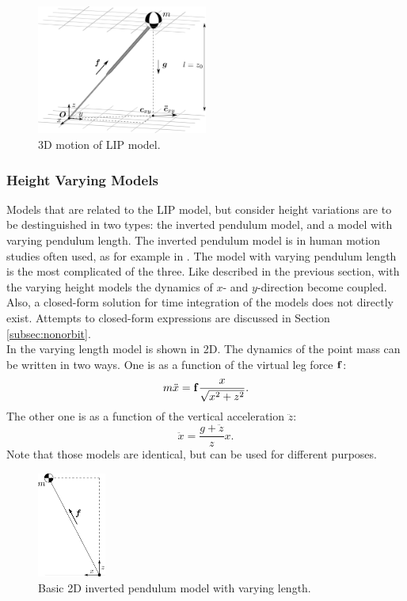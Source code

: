 \begin{figure}[h]
\centering
\includegraphics[width=0.5\textwidth]{STYLESTUFF/3DCoMwithoutfoot.png}
\caption{\ac{3D} motion of \ac{LIP} model.}
\label{fig:3dlip}
\end{figure}

\subsubsection{Height Varying Models}
Models that are related to the \ac{LIP} model, but consider height variations are to be destinguished in two types: the inverted pendulum model, and a model with varying pendulum length. The inverted pendulum model is in human motion studies often used, as for example in \cite{kuo2005energetic}. The model with varying pendulum length is the most complicated of the three. Like described in the previous section, with the varying height models the dynamics of $x$- and $y$-direction become coupled. Also, a closed-form solution for time integration of the models does not directly exist. Attempts to closed-form expressions are discussed in Section \ref{subsec:nonorbit}. \\
In  the varying length model is shown in \ac{2D}. The dynamics of the point mass can be written in two ways. One is as a function of the virtual leg force $\mathbf{f}$:
\begin{equation}
	m\ddot{x} = \mathbf{f}\frac{x}{\sqrt{x^2 + z^2}}.
	\label{eq:dynamicsprattstyle}
\end{equation}
The other one is as a function of the vertical acceleration $\ddot{z}$:
\begin{equation}
	\ddot{x} = \frac{g+\ddot{z}}{z}x.
	\label{eq:dynamicscaronstyle}
\end{equation}
Note that those models are identical, but can be used for different purposes.
\begin{figure}[h]
\centering
\includegraphics[width=0.2\textwidth]{STYLESTUFF/2Dnonlin.png}
\caption{Basic \ac{2D} inverted pendulum model with varying length.}
\label{fig:2Dnonlinmodel}
\end{figure}
